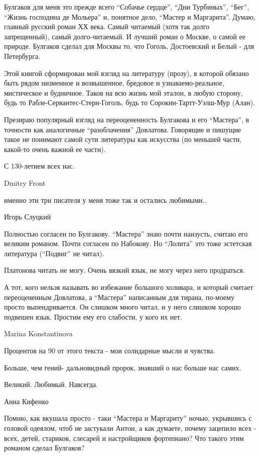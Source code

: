 Булгаков для меня это прежде всего \enquote{Собачье сердце}, \enquote{Дни Турбиных}, \enquote{Бег},
\enquote{Жизнь господина де Мольера} и, понятное дело, \enquote{Мастер и Маргарита}. Думаю,
главный русский роман ХХ века. Самый читаемый (хотя так долго запрещенный),
самый долго-читаемый. И лучший роман о Москве, о самой ее природе. Булгаков
сделал для Москвы то, что Гоголь, Достоевский и Белый - для Петербурга. 

Этой книгой сформирован мой взгляд на литературу (прозу), в которой обязано
быть рядом низменное и возвышенное, бредовое и узнаваемо-реальное, мистическое
и будничное. Таков на всю жизнь мой эталон, в любую сторону, будь то
Рабле-Сервантес-Стерн-Гоголь, будь то Сорокин-Тартт-Уэлш-Мур (Алан). 

Презираю популярный взгляд на переоцененность Булгакова и его \enquote{Мастера}, в
точности как аналогичные \enquote{разоблачения} Довлатова. Говорящие и пишущие такое не
понимают самой сути литературы как искусства (по меньшей части, какой-то очень
важной ее части). 

С 130-летием всех нас.

Dmitry Front

именно эти три писателя у меня тоже так и остались любимыми..

Игорь Слуцкий

Полностью согласен по Булгакову. \enquote{Мастера} знаю почти наизусть, считаю его
великим романом. Почти согласен по Набокову. Но \enquote{Лолита} это тоже эстетская
литература (\enquote{Подвиг} не читал).

Платонова читать не могу. Очень вязкий язык, не могу через него продраться.

А тот, кого нельзя называть во избежание большого холивара, и который считает
переоцененным Довлатова, а \enquote{Мастера} написанным для тирана, по-моему просто
выпендривается. Он слишком много читал, и у него слишком хорошо подвешен язык.
Простим ему его слабости, у кого их нет.

Marina Konstantinova

Процентов на 90 от этого текста - мои солидарные мысли и чувства.

Больше, чем гений- дальновидный пророк, знавший о нас больше нас самих.

Великий. Любимый. Навсегда.

Анна Кифенко

Помню, как вкушала просто - таки \enquote{Мастера и Маргариту} ночью, укрывшись с
головой одеялом, чтоб не застукали Антон, а как думаете, почему зацепило всех
- всех, детей, стариков, слесарей и настройщиков фортепиано? Что такого этим
романом сделал Булгаков?

